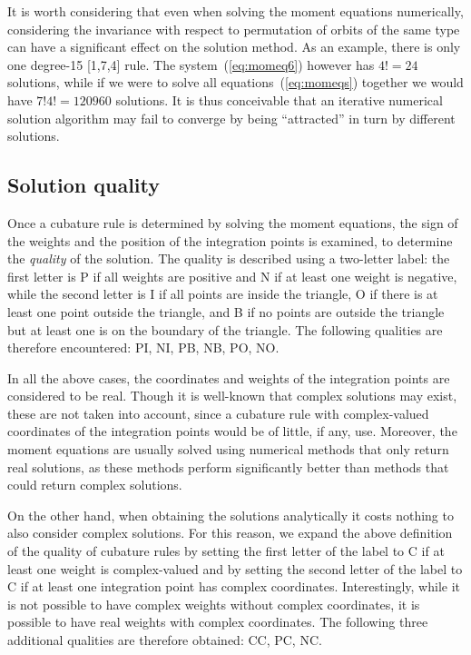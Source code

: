 \documentclass{article}
\begin{document}
It is worth considering that even when solving the moment equations numerically, considering the invariance with respect to permutation of orbits of the same type can have a significant effect on the solution method. As an example, there is only one degree-15 [1,7,4] rule. The system~(\ref{eq:momeq6}) however has $4!=24$ solutions, while if we were to solve all equations~(\ref{eq:momeqs}) together we would have $7!4!=120960$ solutions. It is thus conceivable that an iterative numerical solution algorithm may fail to converge by being ``attracted'' in turn by different solutions.



\subsection{Solution quality}

Once a cubature rule is determined by solving the moment equations, the sign of the weights and the position of the integration points is examined, to determine the \emph{quality} of the solution. The quality is described using a two-letter label: the first letter is P if all weights are positive and N if at least one weight is negative, while the second letter is I if all points are inside the triangle, O if there is at least one point outside the triangle, and B if no points are outside the triangle but at least one is on the boundary of the triangle. The following qualities are therefore encountered: PI, NI, PB, NB, PO, NO.

In all the above cases, the coordinates and weights of the integration points are considered to be real. Though it is well-known that complex solutions may exist, these are not taken into account, since a cubature rule with complex-valued coordinates of the integration points would be of little, if any, use. Moreover, the moment equations are usually solved using numerical methods that only return real solutions, as these methods perform significantly better than methods that could return complex solutions.

On the other hand, when obtaining the solutions analytically it costs nothing to also consider complex solutions. For this reason, we expand the above definition of the quality of cubature rules by setting the first letter of the label to C if at least one weight is complex-valued and by setting the second letter of the label to C if at least one integration point has complex coordinates. Interestingly, while it is not possible to have complex weights without complex coordinates, it is possible to have real weights with complex coordinates. The following three additional qualities are therefore obtained: CC, PC, NC.
\end{document}
